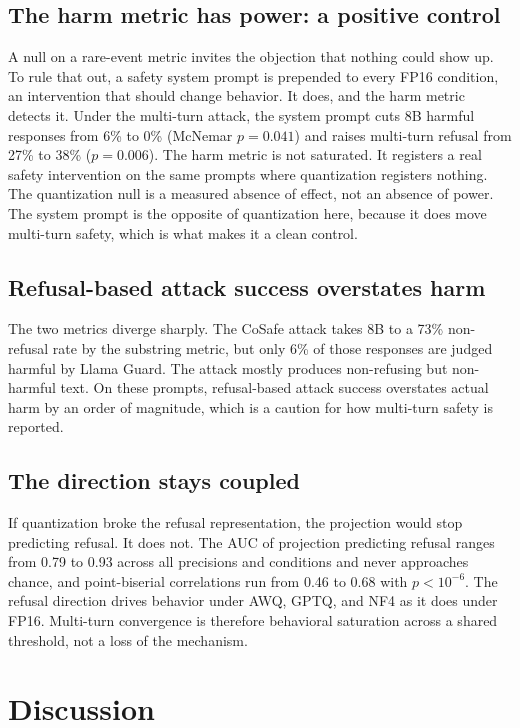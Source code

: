 \documentclass[11pt]{article}
\begin{document}
\subsection{The harm metric has power: a positive control}
A null on a rare-event metric invites the objection that nothing could show up.
To rule that out, a safety system prompt is prepended to every FP16 condition, an
intervention that should change behavior. It does, and the harm metric detects it.
Under the multi-turn attack, the system prompt cuts 8B harmful responses from 6\%
to 0\% (McNemar $p=0.041$) and raises multi-turn refusal from 27\% to 38\%
($p=0.006$). The harm metric is not saturated. It registers a real safety
intervention on the same prompts where quantization registers nothing. The
quantization null is a measured absence of effect, not an absence of power. The
system prompt is the opposite of quantization here, because it does move
multi-turn safety, which is what makes it a clean control.

\subsection{Refusal-based attack success overstates harm}
The two metrics diverge sharply. The CoSafe attack takes 8B to a 73\% non-refusal
rate by the substring metric, but only 6\% of those responses are judged harmful
by Llama Guard. The attack mostly produces non-refusing but non-harmful text. On
these prompts, refusal-based attack success overstates actual harm by an order of
magnitude, which is a caution for how multi-turn safety is reported.

\subsection{The direction stays coupled}
If quantization broke the refusal representation, the projection would stop
predicting refusal. It does not. The AUC of projection predicting refusal ranges
from 0.79 to 0.93 across all precisions and conditions and never approaches
chance, and point-biserial correlations run from 0.46 to 0.68 with $p<10^{-6}$.
The refusal direction drives behavior under AWQ, GPTQ, and NF4 as it does under
FP16. Multi-turn convergence is therefore behavioral saturation across a shared
threshold, not a loss of the mechanism.

\section{Discussion}
\end{document}
